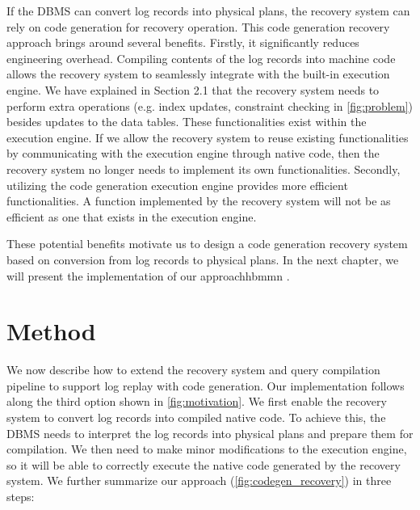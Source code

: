 \documentclass[12pt]{cmuthesis}
\begin{document}
If the DBMS can convert log records into physical plans, the recovery system can rely on code generation for recovery operation. This code generation recovery approach brings around several benefits. Firstly, it significantly reduces engineering overhead. Compiling contents of the log records into machine code allows the recovery system to seamlessly integrate with the built-in execution engine. We have explained in Section 2.1 that the recovery system needs to perform extra operations (e.g. index updates, constraint checking in \cref{fig:problem}) besides updates to the data tables. These functionalities exist within the execution engine. If we allow the recovery system to reuse existing functionalities by communicating with the execution engine through native code, then the recovery system no longer needs to implement its own functionalities. Secondly, utilizing the code generation execution engine provides more efficient functionalities. A function implemented by the recovery system will not be as efficient as one that exists in the execution engine.

These potential benefits motivate us to design a code generation recovery system based on conversion from log records to physical plans. In the next chapter, we will present the implementation of our approachhbmmn .

\chapter{Method}

We now describe how to extend the recovery system and query compilation pipeline to support log replay with code generation. Our implementation follows along the third option shown in \cref{fig:motivation}. We first enable the recovery system to convert log records into compiled native code. To achieve this, the DBMS needs to interpret the log records into physical plans and prepare them for compilation. We then need to make minor modifications to the execution engine, so it will be able to correctly execute the native code generated by the recovery system. We further summarize our approach (\cref{fig:codegen_recovery}) in three steps:
\end{document}
